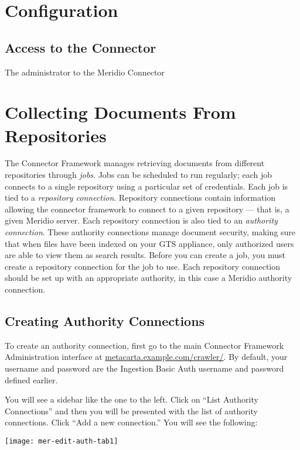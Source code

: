 \begin{changemargin}{1.5in}{0in}
\section{Configuration}

\subsection{Access to the Connector}

The administrator to the Meridio Connector 

\section{Collecting Documents From Repositories} %

The Connector Framework manages retrieving documents from different
repositories through \emph{jobs}. Jobs can be scheduled to run
regularly; each job connects to a single repository using a particular
set of credentials. Each job is tied to a \emph{repository
connection}. Repository connections contain information allowing the
connector framework to connect to a given repository --- that is, a
given Meridio server. Each repository connection is also tied
to an \emph{authority connection}. These authority connections manage
document security, making sure that when files have been indexed on
your GTS appliance, only authorized users are able to view them as
search results. Before you can create a job, you must create a
repository connection for the job to use. Each repository connection
should be set up with an appropriate authority, in this case a
Meridio authority connection. 

\subsection{Creating Authority Connections}

To create an authority connection, first go to the
main Connector Framework Administration interface at
\url{metacarta.example.com/crawler/}.  By default, your username and
password are the Ingestion Basic Auth username and password defined
earlier. 

You will see a sidebar like the one to the left. Click on ``List
Authority Connections'' and then you will be presented with the
list of authority connections. Click ``Add a new connection.''
You will see the following:

\texttt{[image: mer-edit-auth-tab1]}


\end{changemargin}
